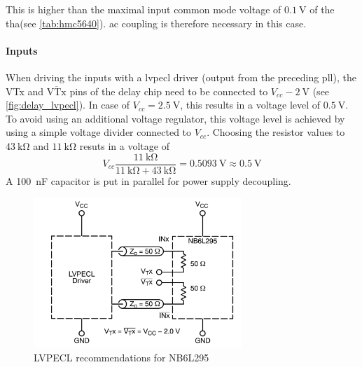 This is higher than the maximal input common mode voltage of $\SI{0.1}{\volt}$ of the \gls{tha}(see \autoref{tab:hmc5640}). \gls{ac} coupling is therefore necessary in this case. 


\paragraph{Inputs}
When driving the inputs with a \gls{lvpecl} driver (output from the preceding \gls{pll}), the VTx and $\overline{\text{VTx}}$ pins of the delay chip need to be connected to $V_{cc} - \SI{2}{\volt}$ (see \autoref{fig:delay_lvpecl}). In case of $V_{cc} = \SI{2.5}{\volt}$, this results in a voltage level of $\SI{0.5}{\volt}$. To avoid using an additional voltage regulator, this voltage level is achieved by using a simple voltage divider connected to $V_{cc}$. Choosing the resistor values to $\SI{43}{\kilo \ohm}$ and $\SI{11}{\kilo \ohm}$ resuts in a voltage of
\begin{equation}
	V_{cc} \frac{\SI{11}{\kilo \ohm}}{\SI{11}{\kilo \ohm} + \SI{43}{\kilo \ohm}} = \SI{0.5093}{\volt} \approx \SI{0.5}{\volt}
\end{equation}
A \SI{100}{\nano \farad} capacitor is put in parallel for power supply decoupling.
\begin{figure}[tbh]
	\centering
	\includegraphics[width = 0.7\textwidth]{chap/04-work/img/delay_lvpecl}
	\caption[NB6L295 Delay Chip Schematic]{LVPECL recommendations for NB6L295 \cite{NB6L295}}
	\label{fig:delay_lvpecl}
\end{figure}


